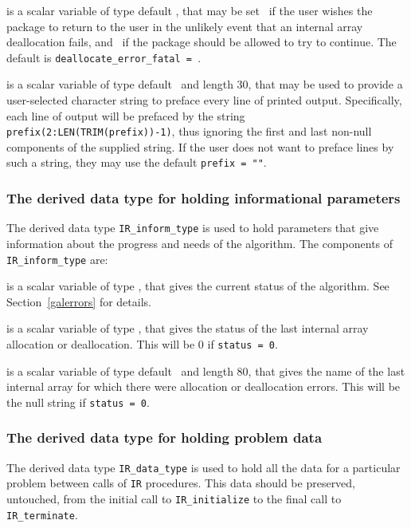 \documentclass{galahad}
\newcommand{\packagename}{IR}
\begin{document}
\begin{description}
 is a scalar variable of type default \logical,
that may be set \true\ if the user wishes the package to return to the user
in the unlikely event that an internal array deallocation fails,
and \false\ if the package should be allowed to try to continue.
The default is {\tt deallocate\_error\_fatal = \false}.

 is a scalar variable of type default \character\
and length 30, that may be used to provide a user-selected
character string to preface every line of printed output.
Specifically, each line of output will be prefaced by the string
{\tt prefix(2:LEN(TRIM(prefix))-1)},
thus ignoring the first and last non-null components of the
supplied string. If the user does not want to preface lines by such
a string, they may use the default {\tt prefix = ""}.

\end{description}


\subsubsection{The derived data type for holding informational
 parameters}\label{typeinform}
The derived data type
{\tt \packagename\_inform\_type}
is used to hold parameters that give information about the progress and needs
of the algorithm. The components of
{\tt \packagename\_inform\_type}
are:

\begin{description}
 is a scalar variable of type \integer, that gives the
current status of the algorithm. See Section~\ref{galerrors} for details.

 is a scalar variable of type \integer,
that gives the status of the last internal array allocation
or deallocation. This will be 0 if {\tt status = 0}.

 is a scalar variable of type default \character\
and length 80, that  gives the name of the last internal array
for which there were allocation or deallocation errors.
This will be the null string if {\tt status = 0}.

\end{description}


\subsubsection{The derived data type for holding problem data}\label{typedata}
The derived data type
{\tt \packagename\_data\_type}
is used to hold all the data for a particular problem between calls of
{\tt \packagename} procedures.
This data should be preserved, untouched, from the initial call to
{\tt \packagename\_initialize}
to the final call to
{\tt \packagename\_terminate}.
\end{document}
